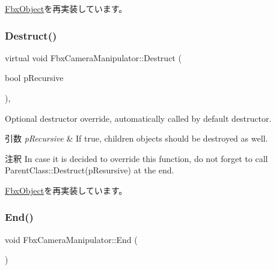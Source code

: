 \hyperlink{class_fbx_object_ad44f814323dc1b5e78bff1bfc608b4bb}{Fbx\+Object}を再実装しています。

\mbox{\label{class_fbx_camera_manipulator_aba0217b5fd302152dc0e2726ca3c325a}} 
\subsubsection{\texorpdfstring{Destruct()}{Destruct()}}
{\footnotesize\ttfamily virtual void Fbx\+Camera\+Manipulator\+::\+Destruct (\begin{DoxyParamCaption}\item[{bool}]{p\+Recursive }\end{DoxyParamCaption})\hspace{0.3cm}{\ttfamily [protected]}, {\ttfamily [virtual]}}

Optional destructor override, automatically called by default destructor. 
\begin{DoxyParams}{引数}
{\em p\+Recursive} & If true, children objects should be destroyed as well. \\
\hline
\end{DoxyParams}
\begin{DoxyRemark}{注釈}
In case it is decided to override this function, do not forget to call Parent\+Class\+::\+Destruct(p\+Resursive) at the end. 
\end{DoxyRemark}


\hyperlink{class_fbx_object_a123e084d9b32b29c28af6384b7c3c608}{Fbx\+Object}を再実装しています。

\mbox{\label{class_fbx_camera_manipulator_ae9eef6e3b92ce1b9f2a7da21a2487bb2}} 
\subsubsection{\texorpdfstring{End()}{End()}}
{\footnotesize\ttfamily void Fbx\+Camera\+Manipulator\+::\+End (\begin{DoxyParamCaption}{ }\end{DoxyParamCaption})}



